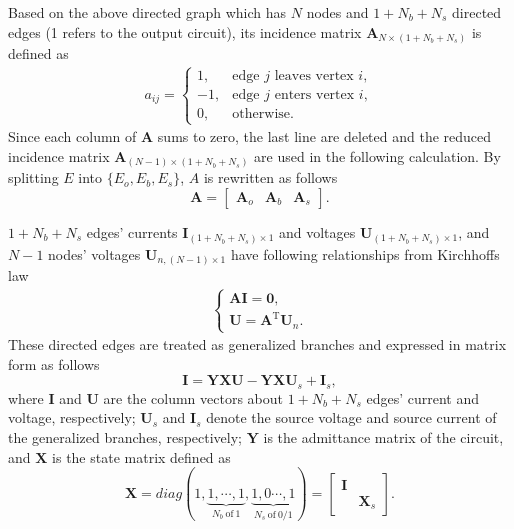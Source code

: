 \documentclass{article}
\def\T{\mathrm{T}}
\begin{document}
Based on the above directed graph which has $N$ nodes and $1+N_b+N_s$ directed edges (1 refers to the output circuit), its incidence matrix $\bm{A}_{N\times (1+N_b+N_s)}$ is defined as
\begin{align}\label{eq:A}
    a_{ij}=
    \begin{cases}
        1,  & \text{edge  $j$ leaves vertex $i$},\\
        -1, & \text{edge $j$ enters vertex $i$},\\
        0,  & \text{otherwise}.
    \end{cases}
\end{align}
Since each column of $\bm{A}$ sums to zero, the last line are deleted and the reduced incidence matrix $\bm{A}_{(N-1)\times(1+N_b+N_s)}$ are used in the following calculation.
By splitting $E$ into $\{E_o, E_b, E_s\}$, $A$ is rewritten as follows
\begin{equation}
    \bm{A} =
    \begin{bmatrix}
        \bm{A}_o & \bm{A}_b & \bm{A}_s
    \end{bmatrix}.
\end{equation}


$1+N_b+N_s$ edges' currents $\bm{I}_{(1+N_b+N_s)\times 1}$ and voltages $\bm{U}_{(1+N_b+N_s)\times 1}$, and $N-1$ nodes' voltages $\bm{U}_{n, (N-1)\times 1}$ have following relationships from Kirchhoffs law
\begin{align}\label{eq:Kirchhoffs_law}
    \begin{cases}
        \bm{A} \bm{I} = \bm{0}, \\
        \bm{U}        = \bm{A}^\T \bm{U}_n.
    \end{cases}
\end{align}
These directed edges are treated as generalized branches and expressed in matrix form as follows
\begin{equation}\label{eq:generalized_branches}
    \bm{I} = \bm{Y}\bm{X} \bm{U} - \bm{Y}\bm{X} \bm{U}_s +\bm{I}_s,
\end{equation}
where $\bm{I}$ and $\bm{U}$ are the column vectors about $1+N_b+N_s$ edges' current and voltage, respectively;
$\bm{U}_s$ and $\bm{I}_s$ denote the source voltage and source current of the generalized branches, respectively;
$\bm{Y}$ is the admittance matrix of the circuit, and $\bm{X}$ is the state matrix defined as
\begin{equation}\label{eq:X}
    \bm{X} = diag(
    1,
    \underbrace{1, \cdots, 1}_{N_b~\text{of}~1},
    \underbrace{1, 0 \cdots, 1}_{N_s~\text{of}~0/1}
    )
    =\begin{bmatrix}
        \bm{I} &\\
        & \bm{X}_s
    \end{bmatrix}.
\end{equation}
\end{document}
